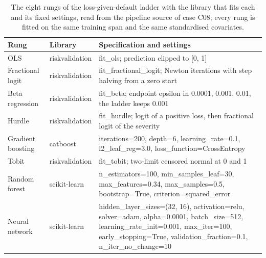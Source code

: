 \begin{table}[htbp]
\centering
\small
\caption{The eight rungs of the loss-given-default ladder with the library that fits each and its fixed settings, read from the pipeline source of case C08; every rung is fitted on the same training span and the same standardised covariates.}
\label{tab:lgd-ead-settings}
\begin{tabular}{llp{8.2cm}}
\toprule
Rung & Library & Specification and settings \\
\midrule
OLS & riskvalidation & \raggedright\arraybackslash fit\_ols; prediction clipped to [0, 1] \\
Fractional logit & riskvalidation & \raggedright\arraybackslash fit\_fractional\_logit; Newton iterations with step halving from a zero start \\
Beta regression & riskvalidation & \raggedright\arraybackslash fit\_beta; endpoint epsilon in {0.0001, 0.001, 0.01}, the ladder keeps 0.001 \\
Hurdle & riskvalidation & \raggedright\arraybackslash fit\_hurdle; logit of a positive loss, then fractional logit of the severity \\
Gradient boosting & catboost & \raggedright\arraybackslash iterations=200, depth=6, learning\_rate=0.1, l2\_leaf\_reg=3.0, loss\_function=CrossEntropy \\
Tobit & riskvalidation & \raggedright\arraybackslash fit\_tobit; two-limit censored normal at 0 and 1 \\
Random forest & scikit-learn & \raggedright\arraybackslash n\_estimators=100, min\_samples\_leaf=30, max\_features=0.34, max\_samples=0.5, bootstrap=True, criterion=squared\_error \\
Neural network & scikit-learn & \raggedright\arraybackslash hidden\_layer\_sizes=(32, 16), activation=relu, solver=adam, alpha=0.0001, batch\_size=512, learning\_rate\_init=0.001, max\_iter=100, early\_stopping=True, validation\_fraction=0.1, n\_iter\_no\_change=10 \\
\bottomrule
\end{tabular}
\end{table}

